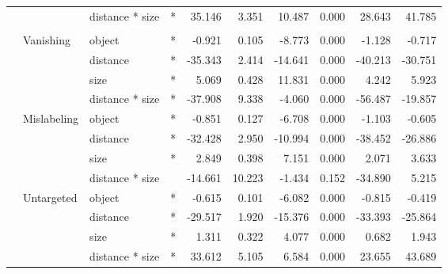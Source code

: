 \documentclass[
]{article}
\begin{document}
\begin{longtable}[t]{llllrrrrrr}
\cmidrule{3-10}\nopagebreak
\hspace{1em} &  & distance * size & * & 35.146 & 3.351 & 10.487 & 0.000 & 28.643 & 41.785\\
\cmidrule{1-10}\pagebreak[0]
\addlinespace[0.3em]
\multicolumn{10}{l}{\textbf{Cascade R-CNN}}\\
\hspace{1em} & Vanishing & object & * & -0.921 & 0.105 & -8.773 & 0.000 & -1.128 & -0.717\\
\cmidrule{3-10}\nopagebreak
\hspace{1em} &  & distance & * & -35.343 & 2.414 & -14.641 & 0.000 & -40.213 & -30.751\\
\cmidrule{3-10}\nopagebreak
\hspace{1em} &  & size & * & 5.069 & 0.428 & 11.831 & 0.000 & 4.242 & 5.923\\
\cmidrule{3-10}\nopagebreak
\hspace{1em} &  & distance * size & * & -37.908 & 9.338 & -4.060 & 0.000 & -56.487 & -19.857\\
\cmidrule{2-10}\nopagebreak
\hspace{1em} & Mislabeling & object & * & -0.851 & 0.127 & -6.708 & 0.000 & -1.103 & -0.605\\
\cmidrule{3-10}\nopagebreak
\hspace{1em} &  & distance & * & -32.428 & 2.950 & -10.994 & 0.000 & -38.452 & -26.886\\
\cmidrule{3-10}\nopagebreak
\hspace{1em} &  & size & * & 2.849 & 0.398 & 7.151 & 0.000 & 2.071 & 3.633\\
\cmidrule{3-10}\nopagebreak
\hspace{1em} &  & distance * size &  & -14.661 & 10.223 & -1.434 & 0.152 & -34.890 & 5.215\\
\cmidrule{2-10}\nopagebreak
\hspace{1em} & Untargeted & object & * & -0.615 & 0.101 & -6.082 & 0.000 & -0.815 & -0.419\\
\cmidrule{3-10}\nopagebreak
\hspace{1em} &  & distance & * & -29.517 & 1.920 & -15.376 & 0.000 & -33.393 & -25.864\\
\cmidrule{3-10}\nopagebreak
\hspace{1em} &  & size & * & 1.311 & 0.322 & 4.077 & 0.000 & 0.682 & 1.943\\
\cmidrule{3-10}\nopagebreak
\hspace{1em} &  & distance * size & * & 33.612 & 5.105 & 6.584 & 0.000 & 23.655 & 43.689\\
\bottomrule
\end{longtable}
\endgroup{}
\end{document}
